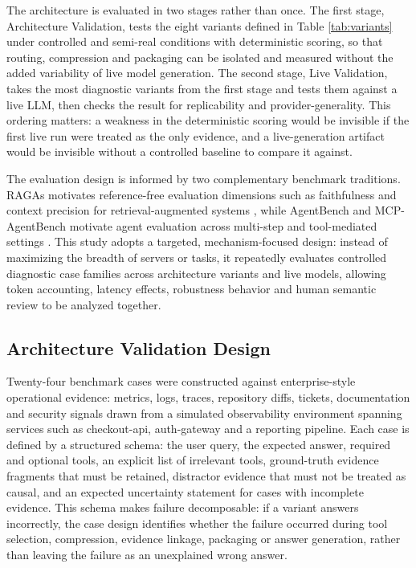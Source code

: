 The architecture is evaluated in two stages rather than once. The first stage, Architecture Validation, tests the eight variants defined in Table \ref{tab:variants} under controlled and semi-real conditions with deterministic scoring, so that routing, compression and packaging can be isolated and measured without the added variability of live model generation. The second stage, Live Validation, takes the most diagnostic variants from the first stage and tests them against a live LLM, then checks the result for replicability and provider-generality. This ordering matters: a weakness in the deterministic scoring would be invisible if the first live run were treated as the only evidence, and a live-generation artifact would be invisible without a controlled baseline to compare it against.

The evaluation design is informed by two complementary benchmark traditions. RAGAs motivates reference-free evaluation dimensions such as faithfulness and context precision for retrieval-augmented systems \cite{Es2024}, while AgentBench and MCP-AgentBench motivate agent evaluation across multi-step and tool-mediated settings \cite{Liu2024b, Guo2026}. This study adopts a targeted, mechanism-focused design: instead of maximizing the breadth of servers or tasks, it repeatedly evaluates controlled diagnostic case families across architecture variants and live models, allowing token accounting, latency effects, robustness behavior and human semantic review to be analyzed together.

\subsection{Architecture Validation Design}

\begin{sloppypar}
Twenty-four benchmark cases were constructed against enterprise-style operational evidence: metrics, logs, traces, repository diffs, tickets, documentation and security signals drawn from a simulated observability environment spanning services such as checkout-api, auth-gateway and a reporting pipeline. Each case is defined by a structured schema: the user query, the expected answer, required and optional tools, an explicit list of irrelevant tools, ground-truth evidence fragments that must be retained, distractor evidence that must not be treated as causal, and an expected uncertainty statement for cases with incomplete evidence. This schema makes failure decomposable: if a variant answers incorrectly, the case design identifies whether the failure occurred during tool selection, compression, evidence linkage, packaging or answer generation, rather than leaving the failure as an unexplained wrong answer.
\end{sloppypar}

